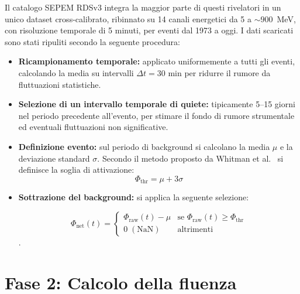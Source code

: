 \documentclass[12pt]{report}
\begin{document}
Il catalogo SEPEM RDSv3 \cite{SEPEM} integra la maggior parte di questi rivelatori in un unico dataset cross-calibrato, ribinnato su 14 canali energetici da 5 a $\sim 900$~MeV, con risoluzione temporale di 5 minuti, per eventi dal 1973 a oggi.
I dati scaricati sono stati ripuliti secondo la seguente procedura: 
\begin{itemize}[nosep]

    \item[-] \textbf{Ricampionamento temporale:} applicato uniformemente a tutti gli eventi, calcolando la media su intervalli $\Delta  t = 30 $ min per ridurre il rumore da fluttuazioni statistiche.

    \item[-] \textbf{Selezione di un intervallo temporale di quiete:} tipicamente 5--15 giorni nel periodo precedente all'evento, per stimare il fondo di rumore strumentale ed eventuali fluttuazioni non significative.

    \item[-] \textbf{Definizione evento:} sul periodo di background si calcolano la media $\mu$ e la deviazione standard $\sigma$. Secondo il metodo proposto da Whitman et al.\ \cite{WhitmanSEP} si definisce la soglia di attivazione:
    \begin{equation}
        \Phi_{\text{thr}} = \mu + 3\sigma 
        \label{eq:soglia_attivazione}
    \end{equation}
   
    \item [-] \textbf{Sottrazione del background:} si applica la seguente selezione:

    \begin{equation}
        \Phi_{\text{net}}(t) =
        \begin{cases}
        \Phi_{\text{raw}}(t) - \mu
        & \text{se } \Phi_{\text{raw}}(t) \geq \Phi_{\text{thr}} \\[6pt]
        0 \; (\text{NaN}) 
        & \text{altrimenti}
        \end{cases}
        \label{eq:selezione soglia}
    \end{equation}.
\end{itemize}

\section{Fase 2: Calcolo della fluenza}    
\end{document}
